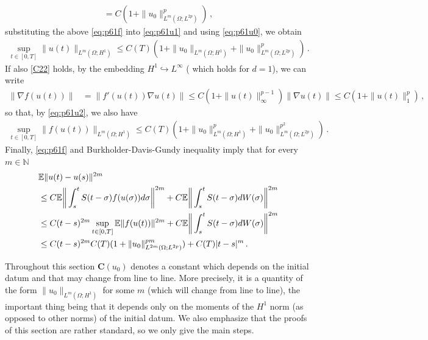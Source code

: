 \documentclass[reqno, 11pt]{amsart}
\theoremstyle{plain}
\theoremstyle{definition}
\theoremstyle{remark}
\numberwithin{equation}{section}
\numberwithin{theorem}{section}
\newcommand{\N}{\mathbb{N}}
\newcommand{\con}{\mathbf{C}}
\begin{document}
{\begin{align}
= C (1+ \|u_0\|^p_{L^{m}(\Omega; L^{2p}) }) \, ,
\end{align} 
 substituting the above \eqref{eq:p61f} into \eqref{eq:p61u1} and using \eqref{eq:p61u0},  we obtain
\begin{align}\label{eq:p61u2}
\sup\limits_{t\in [0,T]} \|u(t)\|_{L^{m}(\Omega; H^1)}\leq C(T)(1+\|u_0\|_{L^{m}(\Omega; H^1)}+\|u_0\|^p_{L^m(\Omega; L^{2p})}) \,.
\end{align}
If also \eqref{C22} holds,  by the embedding $H^1\hookrightarrow L^\infty$ ( which holds for $d=1$), we can write  
\begin{align}\label{eq:nablaf}
\|\nabla f(u(t))\|&=\|f'(u(t))\nabla u(t)\|\leq C( 1+\|u(t)\|_\infty^{p-1})\|\nabla u(t)\|
\leq C(1+\|u(t)\|_1^p) \, ,
\end{align}
so that, by \eqref{eq:p61u2}, 
we also have 
\begin{align}\label{eq:fH1}
\sup\limits_{t\in[0,T]}\|f(u(t))\|_{L^{m}(\Omega;{H}^1)}\leq
C (T) (1+ \|u_0\|^p_{L^m(\Omega; {H}^1)}+ \|u_0\|^{p^2}_{L^m(\Omega; L^{2p})}) \,.
\end{align}
Finally, \eqref{eq:p61f} and Burkholder-Davis-Gundy inequality imply that for every $m \in \N$
\begin{align}\label{eq:contu}
&\mathbb{E}\|u(t)-u(s)\|^{2m}\\
&\leq C\mathbb{E}\bigg\|\int_s^t S(t-\sigma)f(u(\sigma))d\sigma\bigg\|^{2m}+C\mathbb{E}\bigg\|\int_s^t S(t-\sigma)dW(\sigma)\bigg\|^{2m}\notag\\
&\leq C(t-s)^{2m}\sup\limits_{t\in [0,T]}\mathbb{E}\|f(u(t))\|^{2m}+C\mathbb{E}\bigg\|\int_s^t S(t-\sigma)dW(\sigma)\bigg\|^{2m}\notag\\
&\leq C(t-s)^{2m}C(T)(1+\|u_0\|^{pm}_{L^{2m}(\Omega; L^{2p})})+C(T)|t-s|^m  \, . 
\end{align}


Throughout this section $\con(u_0)$ denotes a constant which depends on the initial datum and that may change from line to line. More precisely, it is a quantity of the form $\|u_0\|_{L^m(\Omega ; H^1)}$ for some $m$ (which will change from line to line), the important thing being that it depends only on the  moments of the $H^1$ norm (as opposed to other norms) of the initial datum. 
We also emphasize that the proofs of this section are rather standard, so we only give the main steps. 
}
\end{document}
